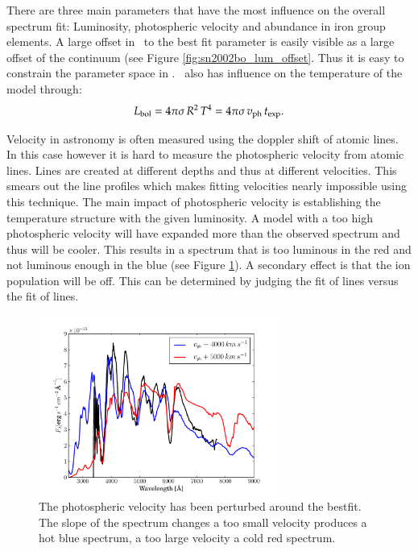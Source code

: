 There are three main parameters that have the most influence on the overall spectrum fit: Luminosity, photospheric velocity and abundance in iron group elements.
A large offset in \lum\ to the best fit parameter is easily visible as a large offset of the continuum (see Figure \ref{fig:sn2002bo_lum_offset}. Thus it is easy to constrain the parameter space in \lum. \lum\ also has influence on the temperature of the model through:
\[
L_{\rm bol} = 4\pi\sigma\, R^2\,T^4 = 4\pi\sigma\,v_{\rm ph}\,t_{\rm exp}.
\label{eq:lum_temp_relation}
\]

Velocity in astronomy is often measured using the doppler shift of atomic lines. In this case however it is hard to measure the photospheric velocity from atomic lines.  Lines are created at different depths and thus at different velocities. This smears out the line profiles which makes fitting velocities nearly impossible using this technique. The main impact of photospheric velocity is establishing the temperature structure with the given luminosity. A model with a too high photospheric velocity will have expanded more than the observed spectrum and thus will be cooler. This results in a spectrum that is too luminous in the red and not luminous enough in the blue (see Figure \ref{fig:sn2002bo_vph_offset}). 
A secondary effect is that the ion population will be off. This can be determined by judging the fit of  lines versus the fit of  lines. 
\begin{figure}[htbp] %
   \centering
   \includegraphics[width=0.7\textwidth]{chapter_dalek/plots/bf2002bo-10_vph.pdf} 
   \caption{The photospheric velocity has been perturbed around the bestfit. The slope of the spectrum changes a too small velocity produces a hot blue spectrum, a too large velocity a cold red spectrum.}
   \label{fig:sn2002bo_vph_offset}
\end{figure}


